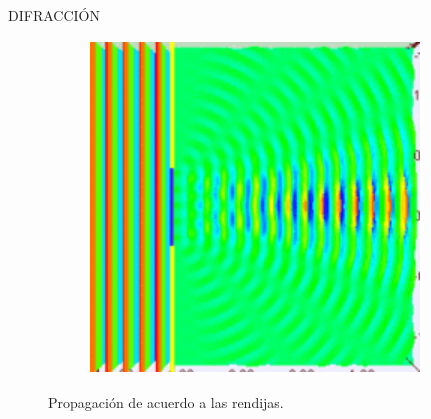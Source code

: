 \begin{frame}{DIFRACCIÓN}
\begin{figure}
\begin{subfigure}[H]{0.25\textwidth}
            \includegraphics[width=\linewidth]{david/wide.PNG}
        \end{subfigure}
        \caption{Propagación de acuerdo a las rendijas\footnotemark{}.}
    \end{figure}
    \vspace{-1cm}

\end{frame}

